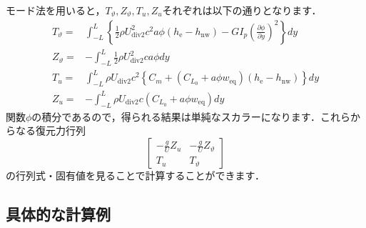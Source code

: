 \documentclass{jarticle}
\begin{document}
モード法を用いると，$T_\vartheta,Z_\vartheta,T_u,Z_u$それぞれは以下の通りとなります．
\begin{align}
    T_\vartheta =& \int_{-L}^{L} \left\{ \frac{1}{2}\rho U_\mathrm{div2}^2 c^2 a \phi  (h_\mathrm{e}-h_\mathrm{nw}) - GI_p\left( \frac{\partial \phi}{\partial y} \right)^2 \right\} dy \\
    Z_\vartheta =& -\int_{-L}^L \frac{1}{2}\rho U_\mathrm{div2}^2 c a \phi dy \\
    T_u =& \int_{-L}^L \rho U_\mathrm{div2} c^2 \left\{ C_m +  (C_{L_0} + a\phi w_\mathrm{eq})  (h_\mathrm{e}-h_\mathrm{nw}) \right\} dy \\
    Z_u =& -\int_{-L}^L \rho U_\mathrm{div2} c (C_{L_0} + a\phi w_\mathrm{eq}) dy
\end{align}
関数$\phi$の積分であるので，得られる結果は単純なスカラーになります．これらからなる復元力行列
\begin{equation}
    \begin{bmatrix}
        -\frac{g}{U}Z_u & -\frac{g}{U}Z_\vartheta \\
        T_u & T_\vartheta
    \end{bmatrix}
\end{equation}
の行列式・固有値を見ることで計算することができます．

\subsection{具体的な計算例}
\end{document}
